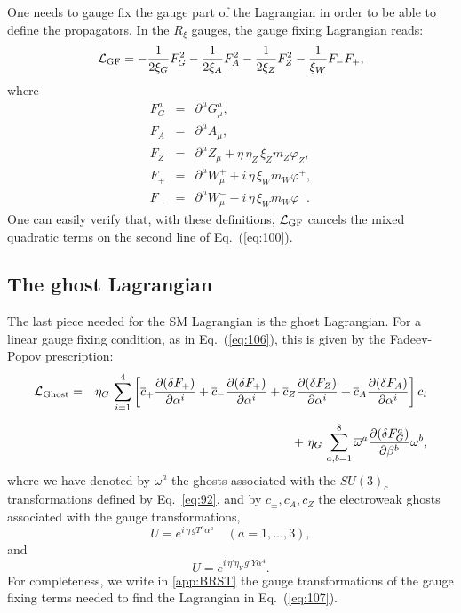 \documentclass{ws-ijmpa}
\begin{document}
One needs to gauge fix the gauge part of the
Lagrangian in order to be able to define the propagators.
In the $R_\xi$ gauges, the gauge fixing Lagrangian reads:
%
\begin{equation}
  \label{eq:102}
  \mathcal{L}_{\rm GF} = -\frac{1}{2\xi_G} F_G^2 -\frac{1}{2\xi_A} F_A^2 
-\frac{1}{2\xi_Z} F_Z^2 - \frac{1}{\xi_W} F_{-} F_{+} ,
\end{equation}
%
where
%
\begin{eqnarray}
F_G^{a}
&=& \partial^\mu  G_\mu^{a},
\nonumber\\
F_A
&=&
\partial^\mu A_\mu ,
\nonumber\\
F_Z 
&=&
\partial^\mu Z_\mu +\eta\,\eta_Z\, \xi_Z m_Z \varphi_Z,
\nonumber\\
F_{+} &=&
\partial^\mu W_\mu^{+} +i\,\eta\, \xi_W m_W \varphi^{+} ,
\nonumber\\
F_{-} &=&
\partial^\mu W_\mu^{-} - i\,\eta\, \xi_W m_W \varphi^{-}.
\label{eq:106}
\end{eqnarray}
%
One can easily verify that,
with these definitions,
$\mathcal{L}_{\rm GF}$ cancels the mixed quadratic terms
on the second line of Eq.~(\ref{eq:100}).



\subsection{The ghost Lagrangian}

The last piece needed for the SM Lagrangian is the ghost Lagrangian.
For a linear gauge fixing condition, as in Eq.~(\ref{eq:106}), this is
given by the Fadeev-Popov prescription:
%
\begin{eqnarray}
\mathcal{L}_{\rm Ghost}
&=&
\eta_G\,
\sum_{i=1}^4 \left[ 
\overline{c}_{+} \frac{\partial(\delta F_{+})}{\partial \alpha^i}
+\overline{c}_{-} \frac{\partial(\delta F_{+})}{\partial \alpha^i}
+\overline{c}_{Z} \frac{\partial(\delta F_{Z})}{\partial \alpha^i}
+\overline{c}_{A} \frac{\partial(\delta F_{A})}{\partial \alpha^i}
\right] c_i
\nonumber\\[+2mm]
& &
+\ 
\eta_G\,
\sum_{a,b=1}^8 \overline{\omega}^a \frac{\partial(\delta
F_{G}^a)}{\partial \beta^b} \omega^b,
\label{eq:107} 
\end{eqnarray}
%
where we have denoted by $\omega^a$ the ghosts associated with the
$SU(3)_c$ transformations defined by Eq.~\eqref{eq:92},
and by $c_\pm,c_A,c_Z$ the electroweak ghosts associated with the
gauge transformations,
%
\begin{equation}
\label{eq:109a}
U = e^{i\, \eta\, g T^a \alpha^a} \quad (a=1,\ldots,3),
\end{equation}
%
and
%
\begin{equation}
\label{eq:109b}
U = e^{i\,\eta'\eta_Y\, g' Y \alpha^4}.
\end{equation}
%
For completeness,
we write in \ref{app:BRST} the gauge transformations of the gauge
fixing terms needed to find the Lagrangian in Eq.~(\ref{eq:107}).
\end{document}

